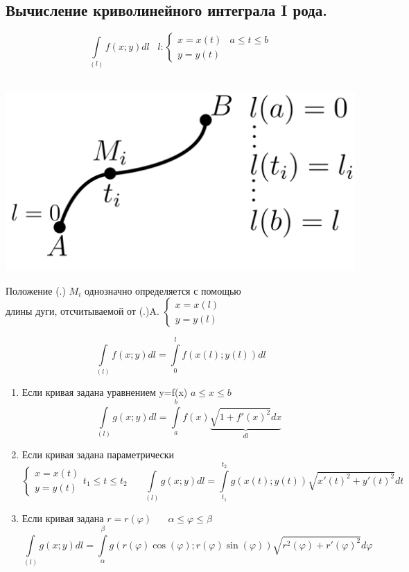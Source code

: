 \documentclass[12pt]{article}
\let\ORIincludegraphics\includegraphics
\renewcommand{\includegraphics}[2][]{\ORIincludegraphics[scale=0.65,#1]{#2}}
\let\oldint\int
\renewcommand{\int}{\oldint\limits}
\begin{document}
  \subsection{Вычисление криволинейного интеграла I рода.}
  \[\int_{(l)} f(x;y) dl \hspace{10pt} l: \begin{cases}
    x=x(t) & a\leq t\leq b\\
    y=y(t)
  \end{cases}\] \\
  \begin{minipage}{0.45\textwidth}
    \includegraphics[scale=0.4]{8.2.1.png}
  \end{minipage}
  \hspace{1em}
  \begin{minipage}{0.65\textwidth}
    Положение (.) $M_i$ однозначно определяется с помощью \\
    длины дуги, отсчитываемой от (.)A. $\begin{cases}
      x=x(l)\\
      y=y(l)
    \end{cases}$
  \end{minipage}
  \vspace{1em}
  \par
  \[\int_{(l)}f(x;y)dl=\int_{0}^{l} f(x(l);y(l))dl\]
  \begin{enumerate}
    \item Если кривая задана уравнением y=f(x) $a \leq x \leq b$\\
    \[\int_{(l)} g(x;y)dl = \int_{a}^{b} f(x) \underbrace{\sqrt{1+f'(x)^2}dx}_{dl}\]
    \item Если кривая задана параметрически\\
    \[\begin{cases}
      x=x(t)\\
      y=y(t)
    \end{cases} t_1 \leq t \leq t_2 \hspace{20pt} \int_{(l)}g(x;y)dl=\int_{t_1}^{t_2}g(x(t);y(t))
    \sqrt{x'(t)^2+y'(t)^2}dt\]
    \item Если кривая задана $r=r(\varphi) \hspace{20pt} \alpha \leq \varphi \leq \beta$\\
    \[\int_{(l)}g(x;y)dl = \int_{\alpha}^{\beta} g(r(\varphi)\cos(\varphi);r(\varphi)\sin(\varphi))
    \sqrt{r^2(\varphi)+r'(\varphi)^2}d\varphi\]
  \end{enumerate}
\end{document}
